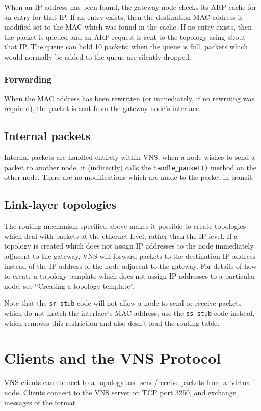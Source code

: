 \documentclass[a4paper,12pt]{report}
\begin{document}
When an IP address has been found, the gateway node checks its ARP cache for an entry for that IP.  If an entry exists, then the destination MAC address is modified set to the MAC which was found in the cache.  If no entry exists, then the packet is queued and an ARP request is sent to the topology asing about that IP.  The queue can hold 10 packets; when the queue is full, packets which would normally be added to the queue are silently dropped.

\subsection{Forwarding}
When the MAC address has been rewritten (or immediately, if no rewriting was required), the packet is sent from the gateway node's interface.

\section{Internal packets}
Internal packets are handled entirely within VNS; when a node wishes to send a packet to another node, it (indirectly) calls the \texttt{handle\_packet()} method on the other node.  There are no modifications which are made to the packet in transit.

\section{Link-layer topologies}
The routing mechanism specified above makes it possible to create topologies which deal with packets at the ethernet level, rather than the IP level.  If a topology is created which does not assign IP addresses to the node immediately adjacent to the gateway, VNS will forward packets to the destination IP address instead of the IP address of the node adjacent to the gateway.  For details of how to create a topology template which does not assign IP addresses to a particular node, see ``Creating a topology template''.

Note that the \texttt{sr\_stub} code will not allow a node to send or receive packets which do not match the interface's MAC address; use the \texttt{ss\_stub} code instead, which removes this restriction and also desn't load the routing table.


\chapter{Clients and the VNS Protocol}
VNS clients can connect to a topology and send/receive packets from a `virtual' node.  Clients connect to the VNS server on TCP port 3250, and exchange messages of the format
\end{document}
